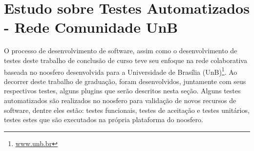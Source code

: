 \section {Estudo sobre Testes Automatizados - Rede Comunidade UnB}

O processo de desenvolvimento de software, assim como o desenvolvimento de testes 
deste trabalho de conclusão de curso teve seu enfoque na rede colaborativa baseada 
no noosfero desenvolvida para a Universidade de Brasília (UnB)\footnote{\url{www.unb.br}}. Ao decorrer deste trabalho de graduação, foram desenvolvidos, juntamente com seus respectivos testes, alguns plugins que serão descritos nesta seção.
%
Alguns testes automatizados são realizados no noosfero para validação de novos 
recursos de software, dentre eles estão: testes funcionais, testes de aceitação e 
testes unitários, testes estes que são executados na própria plataforma do noosfero.
%

